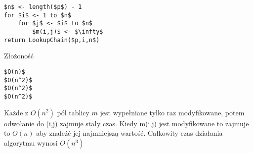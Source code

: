 \begin{lstlisting}[caption={Algorytm MemorizedMatrixChain(p)}]
$n$ <- length($p$) - 1
for $i$ <- 1 to $n$
	for $j$ <- $i$ to $n$
		$m(i,j)$ <- $\infty$
return LookupChain($p,i,n$)
\end{lstlisting}

Złożoność 
\begin{lstlisting}
$O(n)$
$O(n^2)$
$O(n^2)$
$O(n^2)$
\end{lstlisting}

Każde z $O(n^2)$ pól tablicy $m$ jest wypełniane tylko raz modyfikowane, potem odwołanie do (i,j) zajmuje stały czas.
Kiedy m(i,j) jest modyfikowane to zajmuje to $O(n)$ aby znaleźć jej najmniejszą wartość.
Całkowity czas działania algorytmu wynosi $O(n^3)$

